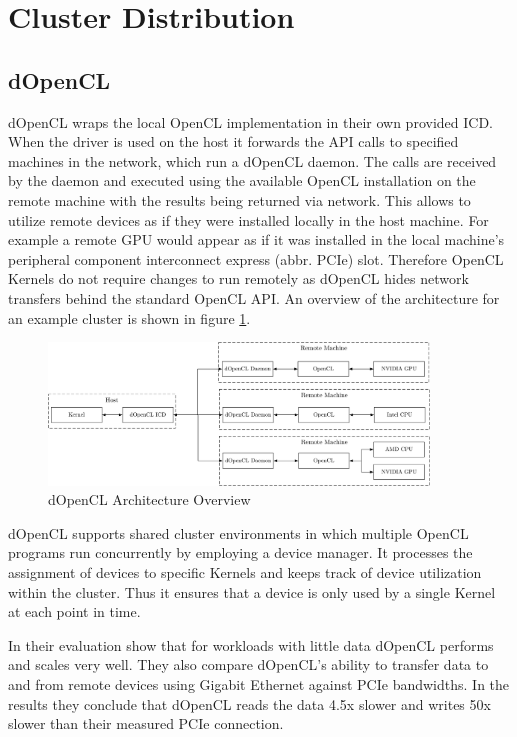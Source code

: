 \section{Cluster Distribution}
\label{cluster_distribution}
\subsection*{dOpenCL}

dOpenCL wraps the local OpenCL implementation in their own provided ICD. When the driver is used on the host it forwards the API calls to specified machines in the network, which run a dOpenCL daemon\cite{dopencl}. The calls are received by the daemon and executed using the available OpenCL installation on the remote machine with the results being returned via network. This allows to utilize remote devices as if they were installed locally in the host machine. For example a remote GPU would appear as if it was installed in the local machine's peripheral component interconnect express (abbr. PCIe) slot. Therefore OpenCL Kernels do not require changes to run remotely as dOpenCL hides network transfers behind the standard OpenCL API. An overview of the architecture for an example cluster is shown in figure \ref{img:dopencl_arch}.

\begin{figure}[H]
	
	\includegraphics[width=0.9\textwidth]{drawings/dopencl_arch.pdf}
	\centering
	\caption{dOpenCL Architecture Overview}
	\label{img:dopencl_arch}
\end{figure}

dOpenCL supports shared cluster environments in which multiple OpenCL programs run concurrently by employing a device manager. It processes the assignment of devices to specific Kernels and keeps track of device utilization within the cluster. Thus it ensures that a device is only used by a single Kernel at each point in time.

In their evaluation \citeauthor{dopencl} show that for workloads with little data dOpenCL performs and scales very well. They also compare dOpenCL's ability to transfer data to and from remote devices using Gigabit Ethernet against PCIe bandwidths. In the results they conclude that dOpenCL reads the data 4.5x slower and writes 50x slower than their measured PCIe connection.

